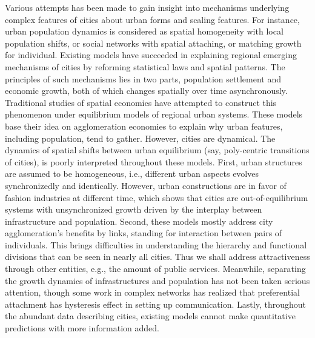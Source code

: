 \documentclass[reprint,unsortedaddress,amsmath,amssymb,aps,prl,showkeys]{revtex4-2}
\begin{document}
Various attempts has been made to gain insight into mechanisms underlying complex features of cities about urban forms and scaling features. For instance, urban population dynamics is considered as spatial homogeneity with local population shifts\cite{PhysRevLett.79.523}, or social networks with spatial attaching\cite{PhysRevX.4.011008}, or matching growth for individual\cite{Li2017Simple}. Existing models have succeeded in explaining regional emerging mechanisms of cities\cite{PhysRevLett.79.523} by reforming statistical laws and spatial patterns\cite{gabaix1999zipf's,clark1951urban}. The principles of such mechanisms lies in two parts, population settlement and economic growth, both of which changes spatially over time asynchronously. Traditional studies of spatial economics have attempted to construct this phenomenon under equilibrium models of regional urban systems\cite{batty1992form}. These models base their idea on agglomeration economies to explain why urban features, including population, tend to gather. However, cities are dynamical\cite{batty1971modelling}. The dynamics of spatial shifts between urban equilibrium (say, poly-centric transitions of cities), is poorly interpreted throughout these models. 
First, %
urban structures are assumed to be homogeneous, i.e., different urban aspects evolves synchronizedly and identically. However, urban constructions are in favor of fashion industries at different time, which shows that cities are out-of-equilibrium systems with unsynchronized growth driven by the interplay between infrastructure and population. 
Second, these models mostly address city agglomeration's benefits by links\cite{Barabasi509}, standing for interaction between pairs of individuals. This brings difficulties in understanding the hierarchy and functional divisions that can be seen in nearly all cities\cite{bassolas2019hierarchical}. Thus we shall address attractiveness through other entities, e.g., the amount of public services. Meanwhile, separating the growth dynamics of infrastructures and population has not been taken serious attention, though some work in complex networks has realized that preferential attachment has hysteresis effect in setting up communication\cite{foster2010communities,hu2008urban}. 
Lastly, throughout the abundant data describing cities, existing models cannot make quantitative predictions with more information added.%
\end{document}
